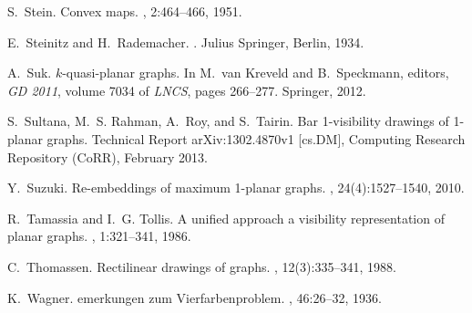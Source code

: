 \documentclass[runningheads]{llncs}
\begin{document}
\begin{thebibliography}{10}
S.~Stein.
\newblock Convex maps.
, 2:464--466, 1951.

E.~Steinitz and H.~Rademacher.
.
\newblock Julius Springer, Berlin, 1934.

A.~Suk.
\newblock $k$-quasi-planar graphs.
\newblock In M.~van Kreveld and B.~Speckmann, editors, {\em {GD} 2011}, volume
  7034 of {\em {LNCS}}, pages 266--277. Springer, 2012.

S.~Sultana, M.~S. Rahman, A.~Roy, and S.~Tairin.
\newblock Bar 1-visibility drawings of 1-planar graphs.
\newblock Technical Report arXiv:1302.4870v1 [cs.DM], Computing Research
  Repository (CoRR), February 2013.

Y.~Suzuki.
\newblock Re-embeddings of maximum 1-planar graphs.
, 24(4):1527--1540, 2010.

R.~Tamassia and I.~G. Tollis.
\newblock A unified approach a visibility representation of planar graphs.
, 1:321--341, 1986.

C.~Thomassen.
\newblock Rectilinear drawings of graphs.
, 12(3):335--341, 1988.

K.~Wagner.
emerkungen zum {V}ierfarbenproblem.
, 46:26--32,
  1936.

\end{thebibliography}
\end{document}
